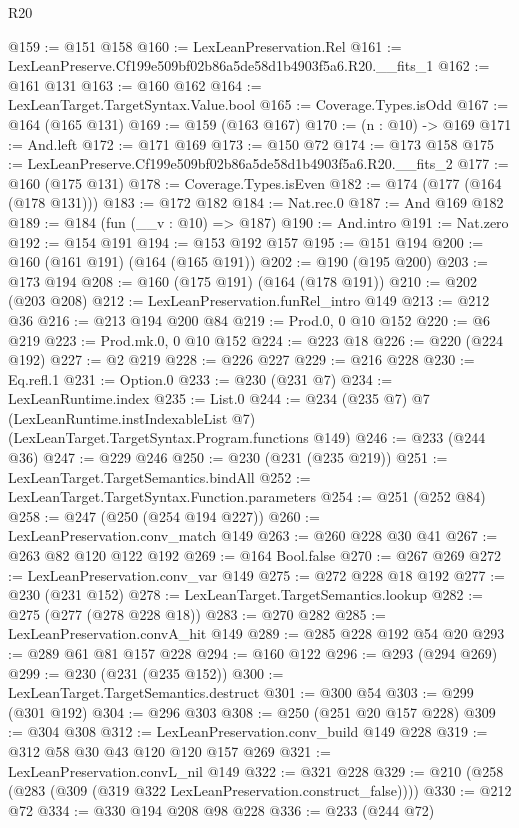 \begin{lexlean}{R20}
\begin{coremodule}
@159 := @151 @158
@160 := LexLeanPreservation.Rel
@161 := LexLeanPreserve.Cf199e509bf02b86a5de58d1b4903f5a6.R20.__fits_1
@162 := @161 @131
@163 := @160 @162
@164 := LexLeanTarget.TargetSyntax.Value.bool
@165 := Coverage.Types.isOdd
@167 := @164 (@165 @131)
@169 := @159 (@163 @167)
@170 := (n : @10) -> @169
@171 := And.left
@172 := @171 @169
@173 := @150 @72
@174 := @173 @158
@175 := LexLeanPreserve.Cf199e509bf02b86a5de58d1b4903f5a6.R20.__fits_2
@177 := @160 (@175 @131)
@178 := Coverage.Types.isEven
@182 := @174 (@177 (@164 (@178 @131)))
@183 := @172 @182
@184 := Nat.rec.{0}
@187 := And @169 @182
@189 := @184 (fun (__v : @10) => @187)
@190 := And.intro
@191 := Nat.zero
@192 := @154 @191
@194 := @153 @192 @157
@195 := @151 @194
@200 := @160 (@161 @191) (@164 (@165 @191))
@202 := @190 (@195 @200)
@203 := @173 @194
@208 := @160 (@175 @191) (@164 (@178 @191))
@210 := @202 (@203 @208)
@212 := LexLeanPreservation.funRel_intro @149
@213 := @212 @36
@216 := @213 @194 @200 @84
@219 := Prod.{0, 0} @10 @152
@220 := @6 @219
@223 := Prod.mk.{0, 0} @10 @152
@224 := @223 @18
@226 := @220 (@224 @192)
@227 := @2 @219
@228 := @226 @227
@229 := @216 @228
@230 := Eq.refl.{1}
@231 := Option.{0}
@233 := @230 (@231 @7)
@234 := LexLeanRuntime.index
@235 := List.{0}
@244 := @234
    (@235 @7)
    @7
    (LexLeanRuntime.instIndexableList @7)
    (LexLeanTarget.TargetSyntax.Program.functions @149)
@246 := @233 (@244 @36)
@247 := @229 @246
@250 := @230 (@231 (@235 @219))
@251 := LexLeanTarget.TargetSemantics.bindAll
@252 := LexLeanTarget.TargetSyntax.Function.parameters
@254 := @251 (@252 @84)
@258 := @247 (@250 (@254 @194 @227))
@260 := LexLeanPreservation.conv_match @149
@263 := @260 @228 @30 @41
@267 := @263 @82 @120 @122 @192
@269 := @164 Bool.false
@270 := @267 @269
@272 := LexLeanPreservation.conv_var @149
@275 := @272 @228 @18 @192
@277 := @230 (@231 @152)
@278 := LexLeanTarget.TargetSemantics.lookup
@282 := @275 (@277 (@278 @228 @18))
@283 := @270 @282
@285 := LexLeanPreservation.convA_hit @149
@289 := @285 @228 @192 @54 @20
@293 := @289 @61 @81 @157 @228
@294 := @160 @122
@296 := @293 (@294 @269)
@299 := @230 (@231 (@235 @152))
@300 := LexLeanTarget.TargetSemantics.destruct
@301 := @300 @54
@303 := @299 (@301 @192)
@304 := @296 @303
@308 := @250 (@251 @20 @157 @228)
@309 := @304 @308
@312 := LexLeanPreservation.conv_build @149 @228
@319 := @312 @58 @30 @43 @120 @120 @157 @269
@321 := LexLeanPreservation.convL_nil @149
@322 := @321 @228
@329 := @210 (@258 (@283 (@309 (@319 @322 LexLeanPreservation.construct_false))))
@330 := @212 @72
@334 := @330 @194 @208 @98 @228
@336 := @233 (@244 @72)

\end{coremodule}
\end{lexlean}
